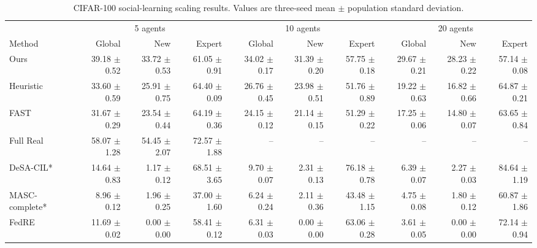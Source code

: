 \begin{table}[t]
\centering
\caption{CIFAR-100 social-learning scaling results. Values are three-seed mean $\pm$ population standard deviation.}
\begin{tabular}{lrrrrrrrrr}
\toprule
& \multicolumn{3}{c}{5 agents} & \multicolumn{3}{c}{10 agents} & \multicolumn{3}{c}{20 agents} \\
Method & Global & New & Expert & Global & New & Expert & Global & New & Expert \\
\midrule
Ours & 39.18 $\pm$ 0.52 & 33.72 $\pm$ 0.53 & 61.05 $\pm$ 0.91 & 34.02 $\pm$ 0.17 & 31.39 $\pm$ 0.20 & 57.75 $\pm$ 0.18 & 29.67 $\pm$ 0.21 & 28.23 $\pm$ 0.22 & 57.14 $\pm$ 0.08 \\
Heuristic & 33.60 $\pm$ 0.59 & 25.91 $\pm$ 0.75 & 64.40 $\pm$ 0.09 & 26.76 $\pm$ 0.45 & 23.98 $\pm$ 0.51 & 51.76 $\pm$ 0.89 & 19.22 $\pm$ 0.63 & 16.82 $\pm$ 0.66 & 64.87 $\pm$ 0.21 \\
FAST & 31.67 $\pm$ 0.29 & 23.54 $\pm$ 0.44 & 64.19 $\pm$ 0.36 & 24.15 $\pm$ 0.12 & 21.14 $\pm$ 0.15 & 51.29 $\pm$ 0.22 & 17.25 $\pm$ 0.06 & 14.80 $\pm$ 0.07 & 63.65 $\pm$ 0.84 \\
Full Real & 58.07 $\pm$ 1.28 & 54.45 $\pm$ 2.07 & 72.57 $\pm$ 1.88 & -- & -- & -- & -- & -- & -- \\
DeSA-CIL* & 14.64 $\pm$ 0.83 & 1.17 $\pm$ 0.12 & 68.51 $\pm$ 3.65 & 9.70 $\pm$ 0.07 & 2.31 $\pm$ 0.13 & 76.18 $\pm$ 0.78 & 6.39 $\pm$ 0.07 & 2.27 $\pm$ 0.03 & 84.64 $\pm$ 1.19 \\
MASC-complete* & 8.96 $\pm$ 0.12 & 1.96 $\pm$ 0.25 & 37.00 $\pm$ 1.60 & 6.24 $\pm$ 0.24 & 2.11 $\pm$ 0.36 & 43.48 $\pm$ 1.15 & 4.75 $\pm$ 0.08 & 1.80 $\pm$ 0.12 & 60.87 $\pm$ 1.86 \\
FedRE & 11.69 $\pm$ 0.02 & 0.00 $\pm$ 0.00 & 58.41 $\pm$ 0.12 & 6.31 $\pm$ 0.03 & 0.00 $\pm$ 0.00 & 63.06 $\pm$ 0.28 & 3.61 $\pm$ 0.05 & 0.00 $\pm$ 0.00 & 72.14 $\pm$ 0.94 \\
\bottomrule
\end{tabular}
\end{table}
